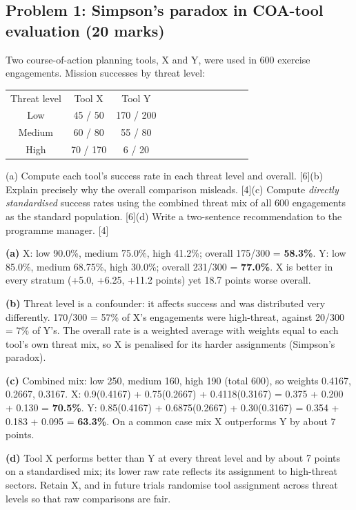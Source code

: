 \documentclass[11pt]{article}
\begin{document}
\subsection{Problem 1: Simpson's paradox in COA-tool evaluation \normalfont\small\color{GreyN}(20 marks)}

\begin{prob}Two course-of-action planning tools, X and Y, were used in 600 exercise engagements. Mission successes by threat level:

\begin{center}\small\begin{tabular}{@{}cccccccccccc@{}}\toprule Threat level&Tool X&Tool Y\\
Low&45 / 50&170 / 200\\
Medium&60 / 80&55 / 80\\
High&70 / 170&6 / 20\\\bottomrule
\end{tabular}\end{center}

(a) Compute each tool's success rate in each threat level and overall. [6]\newline (b) Explain precisely why the overall comparison misleads. [4]\newline (c) Compute \textit{directly standardised} success rates using the combined threat mix of all 600 engagements as the standard population. [6]\newline (d) Write a two-sentence recommendation to the programme manager. [4]\end{prob}

\begin{soln}\textbf{(a)} X: low 90.0\%, medium 75.0\%, high 41.2\%; overall 175/300 = \textbf{58.3\%}. Y: low 85.0\%, medium 68.75\%, high 30.0\%; overall 231/300 = \textbf{77.0\%}. X is better in every stratum (+5.0, +6.25, +11.2 points) yet 18.7 points worse overall.

\textbf{(b)} Threat level is a confounder: it affects success and was distributed very differently. 170/300 = 57\% of X's engagements were high-threat, against 20/300 = 7\% of Y's. The overall rate is a weighted average with weights equal to each tool's own threat mix, so X is penalised for its harder assignments (Simpson's paradox).

\textbf{(c)} Combined mix: low 250, medium 160, high 190 (total 600), so weights 0.4167, 0.2667, 0.3167. X: 0.9(0.4167) + 0.75(0.2667) + 0.4118(0.3167) = 0.375 + 0.200 + 0.130 = \textbf{70.5\%}. Y: 0.85(0.4167) + 0.6875(0.2667) + 0.30(0.3167) = 0.354 + 0.183 + 0.095 = \textbf{63.3\%}. On a common case mix X outperforms Y by about 7 points.

\textbf{(d)} Tool X performs better than Y at every threat level and by about 7 points on a standardised mix; its lower raw rate reflects its assignment to high-threat sectors. Retain X, and in future trials randomise tool assignment across threat levels so that raw comparisons are fair.\end{soln}
\end{document}
